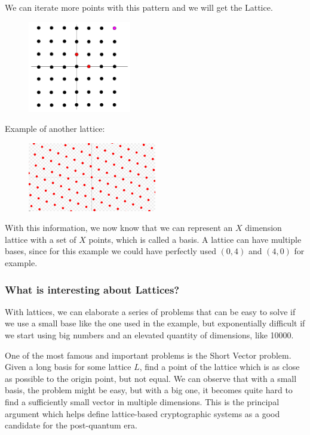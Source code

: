 We can iterate more points with this pattern and we will get the Lattice.

\begin{figure}[H]
    \centering
    \includegraphics[width=0.4\textwidth]{images/lattice2}
\end{figure}

Example of another lattice:

\begin{figure}[H]
    \centering
    \includegraphics[width=0.5\textwidth]{images/lattice3}
\end{figure}

With this information, we now know that we can represent an $X$ dimension
lattice with a set of $X$ points, which is called a basis. A lattice can have
multiple bases, since for this example we could have perfectly used $(0,4)$ and
$(4,0)$ for example.

\subsubsection{What is interesting about Lattices?}

With lattices, we can elaborate a series of problems that can be easy to solve
if we use a small base like the one used in the example, but exponentially
difficult if we start using big numbers and an elevated quantity of dimensions,
like 10000.

One of the most famous and important problems is the Short Vector problem. Given
a long basis for some lattice $L$, find a point of the lattice which is as close
as possible to the origin point, but not equal. We can observe that with a small
basis, the problem might be easy, but with a big one, it becomes quite hard to
find a sufficiently small vector in multiple dimensions. This is the principal
argument which helps define lattice-based cryptographic systems as a good
candidate for the post-quantum era.

